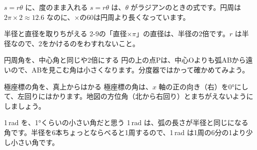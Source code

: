 \begin{tsumazuki}{$s=r\theta$ に、度のまま入れる}
$s=r\theta$ は、$\theta$ がラジアンのときの式です。円周は $2\pi\times2\approx12.6$ なのに、×の60は円周より長くなっています。
\end{tsumazuki}

\begin{tsumazuki}{半径と直径を取りちがえる}
2-9の「直径×$\pi$」の直径は、半径の2倍です。$r$ は半径なので、2をかけるのをわすれないこと。
\end{tsumazuki}

\begin{tsumazuki}{円周角を、中心角と同じや2倍にする}
円の上の点Pは、中心Oよりも弧ABから遠いので、ABを見こむ角は小さくなります。分度器ではかって確かめてみよう。
\end{tsumazuki}

\begin{tsumazuki}{極座標の角を、真上からはかる}
極座標の角は、$x$ 軸の正の向き（右）を0°にして、左回りにはかります。地図の方位角（北から右回り）とまちがえないようにしましょう。
\end{tsumazuki}

\begin{tsumazuki}{1\,rad を、1°くらいの小さい角だと思う}
1\,rad は、弧の長さが半径と同じになる角です。半径を6本ちょっとならべると1周するので、1\,rad は1周の6分の1より少し小さい角です。
\end{tsumazuki}

